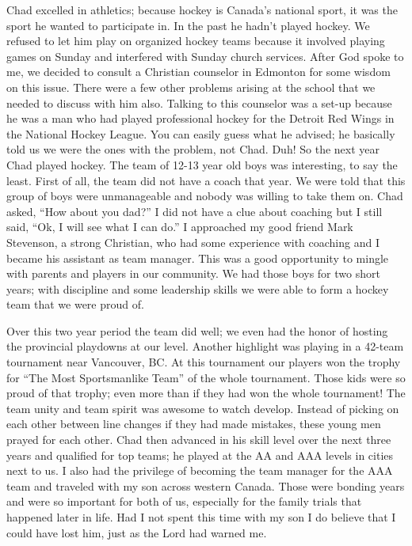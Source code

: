 \documentclass[twoside, 12pt]{book}
\begin{document}
Chad excelled in athletics; because hockey is Canada's national sport, it was the sport he wanted to participate in. In the past he hadn't played hockey. We refused to let him play on organized hockey teams because it involved playing games on Sunday and interfered with Sunday church services. After God spoke to me, we decided to consult a Christian counselor in Edmonton for some wisdom on this issue. There were a few other problems arising at the school that we needed to discuss with him also. Talking to this counselor was a set-up because he was a man who had played professional hockey for the Detroit Red Wings in the National Hockey League. You can easily guess what he advised; he basically told us we were the ones with the problem, not Chad. Duh! So the next year Chad played hockey. The team of 12-13 year old boys was interesting, to say the least. First of all, the team did not have a coach that year. We were told that this group of boys were unmanageable and nobody was willing to take them on. Chad asked, “How about you dad?” I did not have a clue about coaching but I still said, “Ok, I will see what I can do.” I approached my good friend Mark Stevenson, a strong Christian, who had some experience with coaching and I became his assistant as team manager. This was a good opportunity to mingle with parents and players in our community. We had those boys for two short years; with discipline and some leadership skills we were able to form a hockey team that we were proud of.

Over this two year period the team did well; we even had the honor of hosting the provincial playdowns at our level. Another highlight was playing in a 42-team tournament near Vancouver, BC. At this tournament our players won the trophy for “The Most Sportsmanlike Team” of the whole tournament. Those kids were so proud of that trophy; even more than if they had won the whole tournament! The team unity and team spirit was awesome to watch develop. Instead of picking on each other between line changes if they had made mistakes, these young men prayed for each other. Chad then advanced in his skill level over the next three years and qualified for top teams; he played at the AA and AAA levels in cities next to us. I also had the privilege of becoming the team manager for the AAA team and traveled with my son across western Canada. Those were bonding years and were so important for both of us, especially for the family trials that happened later in life. Had I not spent this time with my son I do believe that I could have lost him, just as the Lord had warned me.
\end{document}

